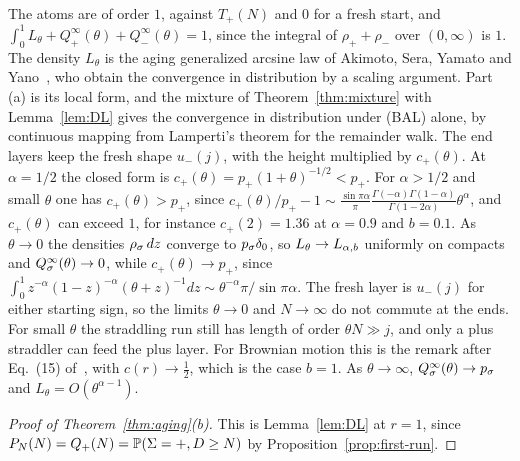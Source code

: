 The atoms are of order $1$, against $T_\plus(N)$ and $0$ for a fresh start, and
$\int_0^1L_\theta+Q^\infty_\plus(\theta)+Q^\infty_\minus(\theta)=1$, since the integral of
$\rho_\plus+\rho_\minus$ over $(0,\infty)$ is $1$. The density $L_\theta$ is the aging
generalized arcsine law of Akimoto, Sera, Yamato and Yano~\cite[Theorem~2]{asyy2020}, who obtain
the convergence in distribution by a scaling argument. Part (a) is its local form, and the
mixture of Theorem~\ref{thm:mixture} with Lemma~\ref{lem:DL} gives the convergence in
distribution under (BAL) alone, by continuous mapping from Lamperti's theorem for the
remainder walk. The end layers keep the fresh shape $u_\minus(j)$, with the height multiplied by
$c_\plus(\theta)$. At $\alpha=1/2$ the closed form is $c_\plus(\theta)=p_\plus(1+\theta)^{-1/2}<p_\plus$.
For $\alpha>1/2$ and small $\theta$ one has $c_\plus(\theta)>p_\plus$, since
$c_\plus(\theta)/p_\plus-1\sim\frac{\sin\pi\alpha}\pi\frac{\Gamma(-\alpha)\Gamma(1-\alpha)}{\Gamma(1-2\alpha)}\theta^\alpha$,
and $c_\plus(\theta)$ can exceed $1$, for instance $c_\plus(2)=1.36$ at $\alpha=0.9$ and $b=0.1$. As $\theta\to0$ the densities $\rho_\sigma\,dz$ converge to
$p_\sigma\delta_0$, so $L_\theta\to L_{\alpha,b}$ uniformly on compacts and $Q^\infty_\sigma(\theta)\to0$, while
$c_\plus(\theta)\to p_\plus$, since
$\int_0^1z^{-\alpha}(1-z)^{-\alpha}(\theta+z)^{-1}dz\sim\theta^{-\alpha}\pi/\sin\pi\alpha$. The fresh
layer is $u_\minus(j)$ for either starting sign, so the limits $\theta\to0$ and $N\to\infty$ do
not commute at the ends. For small $\theta$ the straddling run still has length of order
$\theta N\gg j$, and only a plus straddler can feed the plus layer. For Brownian motion this
is the remark after Eq.~(15) of~\cite{asyy2020}, with $c(r)\to\frac12$, which is the case $b=1$.
As $\theta\to\infty$, $Q^\infty_\sigma(\theta)\to p_\sigma$ and $L_\theta=O(\theta^{\alpha-1})$.

\begin{proof}[Proof of Theorem~\ref{thm:aging}(b)]
This is Lemma~\ref{lem:DL} at $r=1$, since $P_N(N)=Q_{+}(N)=\mathbb{P}(\Sigma={+},D\ge N)$ by
Proposition~\ref{prop:first-run}.
\end{proof}

